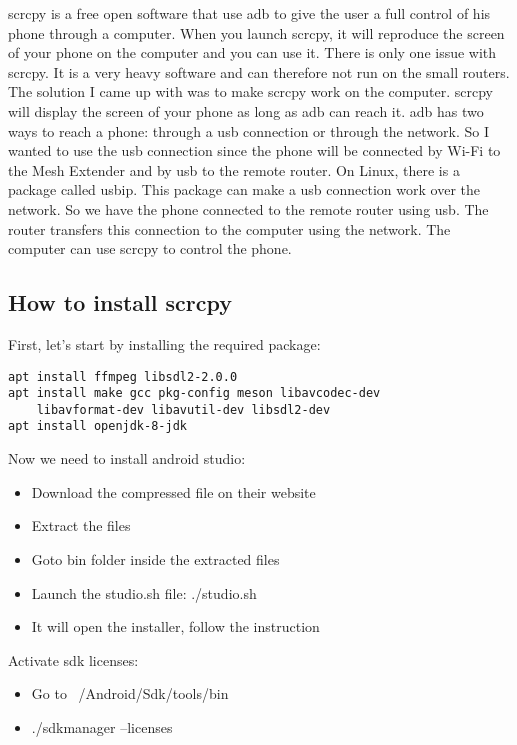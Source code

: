 scrcpy is a free open software that use adb to give the user a full control of his phone through a computer. When you launch scrcpy, it will reproduce the screen of your phone on the computer and you can use it.
There is only one issue with scrcpy. It is a very heavy software and can therefore not run on the small routers. 
The solution I came up with was to make scrcpy work on the computer. scrcpy will display the screen of your phone as long as adb can reach it. adb has two ways to reach a phone: through a usb connection or through the network. So I wanted to use the usb connection since the phone will be connected by Wi-Fi to the Mesh Extender and by usb to the remote router. On Linux, there is a package called usbip. This package can make a usb connection work over the network. So we have the phone connected to the remote router using usb. The router transfers this connection to the computer using the network. The computer can use scrcpy to control the phone.


\subsection{How to install scrcpy}


First, let's start by installing the required package:
\begin{lstlisting}
apt install ffmpeg libsdl2-2.0.0
apt install make gcc pkg-config meson libavcodec-dev 
	libavformat-dev libavutil-dev libsdl2-dev
apt install openjdk-8-jdk
\end{lstlisting}



Now we need to install android studio:
\begin{itemize}
	\item Download the compressed file on their website
  \item Extract the files
  \item Goto bin folder inside the extracted files
  \item Launch the studio.sh file: ./studio.sh
  \item It will open the installer, follow the instruction
\end{itemize}


Activate sdk licenses:
\begin{itemize}
	\item Go to ~/Android/Sdk/tools/bin
	\item ./sdkmanager --licenses
\end{itemize}
        

